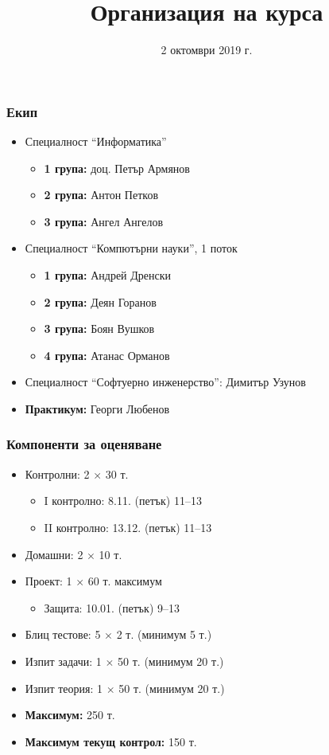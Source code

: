 \documentclass[alsotrans]{beamerswitch}
\title{Организация на курса}
\date{2 октомври 2019 г.}
\begin{document}
\begin{frame}
  \titlepage
\end{frame}

\begin{frame}
  \frametitle{Екип}

  \begin{itemize}
  \item Специалност ``Информатика''
    \begin{itemize}
    \item \textbf{1 група:} доц. Петър Армянов 
    \item \textbf{2 група:} Антон Петков
    \item \textbf{3 група:} Ангел Ангелов
    \end{itemize}
  \item Специалност ``Компютърни науки'', 1 поток
    \begin{itemize}
    \item \textbf{1 група:} Андрей Дренски
    \item \textbf{2 група:} Деян Горанов
    \item \textbf{3 група:} Боян Вушков
    \item \textbf{4 група:} Атанас Орманов
    \end{itemize}
  \item Специалност ``Софтуерно инженерство'': Димитър Узунов
  \item \textbf{Практикум:} Георги Любенов
\end{itemize}
\end{frame}

\begin{frame}
  \frametitle{Компоненти за оценяване}

  \begin{itemize}
  \item Контролни: 2 $\times$ 30 т.
    \begin{itemize}
    \item I контролно: 8.11. (петък) 11--13
    \item II контролно: 13.12. (петък) 11--13
    \end{itemize}
  \item Домашни: 2 $\times$ 10 т.
  \item Проект: 1 $\times$ 60 т. максимум
    \begin{itemize}
    \item Защита: 10.01. (петък) 9--13
    \end{itemize}
  \item Блиц тестове: 5 $\times$ 2 т. \alert{(минимум 5 т.)}
  \item Изпит задачи: 1 $\times$ 50 т. \alert{(минимум 20 т.)}
  \item Изпит теория: 1 $\times$ 50 т. \alert{(минимум 20 т.)}
  \item \textbf{Максимум:} 250 т.
  \item \textbf{Максимум текущ контрол:} 150 т.
  \end{itemize}
\end{frame}
\end{document}
